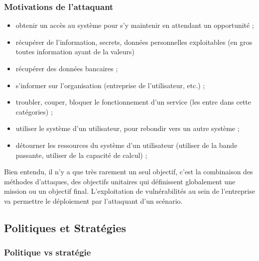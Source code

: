 \begin{frame}
\frametitle<presentation>{Motivations de l'attaquant}

\begin{itemize}
\item obtenir un accès au système pour s’y maintenir en attendant un opportunité ;
\item récupérer de l’information, secrets, données personnelles exploitables (en gros toutes information ayant de la valeurs)
\item récupérer des données bancaires ;
\item s'informer sur l'organisation (entreprise de l'utilisateur, etc.) ;
\item troubler, couper, bloquer le fonctionnement d'un service (les  entre dans cette catégories) ;
\item utiliser le système d’un utilisateur, pour rebondir vers un autre système ;
\item détourner les ressources du système d’un utilisateur (utiliser de la bande passante, utiliser de la capacité de calcul) ;
\end{itemize}
\end{frame}

Bien entendu, il n’y a que très rarement un seul objectif, c’est la combinaison des méthodes d’attaques, des objectifs unitaires qui définissent globalement une mission ou un objectif final. L’exploitation de vulnérabilités au sein de l’entreprise va permettre le déploiement par l’attaquant d’un scénario.

\subsection{Politiques et Stratégies}

\begin{frame}
\frametitle<presentation>{Politique vs stratégie}


\end{frame}

